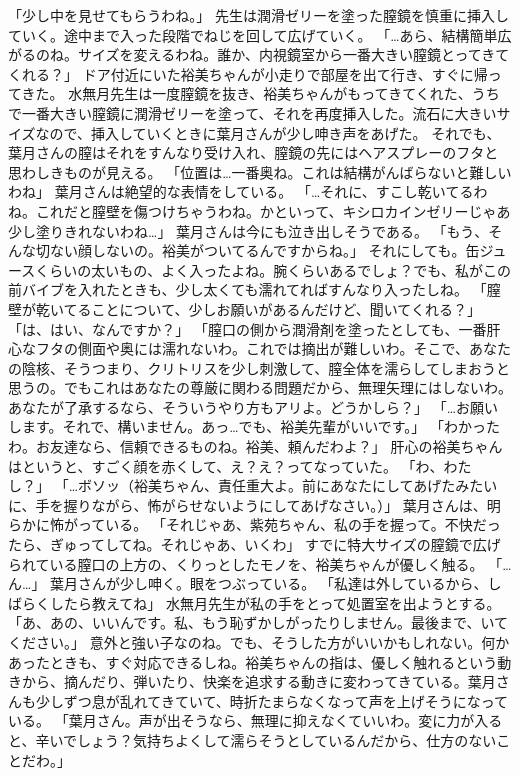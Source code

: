 「少し中を見せてもらうわね。」
先生は潤滑ゼリーを塗った膣鏡を慎重に挿入していく。途中まで入った段階でねじを回して広げていく。
「…あら、結構簡単広がるのね。サイズを変えるわね。誰か、内視鏡室から一番大きい膣鏡とってきてくれる？」
ドア付近にいた裕美ちゃんが小走りで部屋を出て行き、すぐに帰ってきた。
水無月先生は一度膣鏡を抜き、裕美ちゃんがもってきてくれた、うちで一番大きい膣鏡に潤滑ゼリーを塗って、それを再度挿入した。流石に大きいサイズなので、挿入していくときに葉月さんが少し呻き声をあげた。
それでも、葉月さんの膣はそれをすんなり受け入れ、膣鏡の先にはヘアスプレーのフタと思わしきものが見える。
「位置は…一番奥ね。これは結構がんばらないと難しいわね」
葉月さんは絶望的な表情をしている。
「…それに、すこし乾いてるわね。これだと膣壁を傷つけちゃうわね。かといって、キシロカインゼリーじゃあ少し塗りきれないわね…」
葉月さんは今にも泣き出しそうである。
「もう、そんな切ない顔しないの。裕美がついてるんですからね。」
それにしても。缶ジュースくらいの太いもの、よく入ったよね。腕くらいあるでしょ？でも、私がこの前バイブを入れたときも、少し太くても濡れてればすんなり入ったしね。
「膣壁が乾いてることについて、少しお願いがあるんだけど、聞いてくれる？」
「は、はい、なんですか？」
「膣口の側から潤滑剤を塗ったとしても、一番肝心なフタの側面や奥には濡れないわ。これでは摘出が難しいわ。そこで、あなたの陰核、そうつまり、クリトリスを少し刺激して、膣全体を濡らしてしまおうと思うの。でもこれはあなたの尊厳に関わる問題だから、無理矢理にはしないわ。あなたが了承するなら、そういうやり方もアリよ。どうかしら？」
「…お願いします。それで、構いません。あっ…でも、裕美先輩がいいです。」
「わかったわ。お友達なら、信頼できるものね。裕美、頼んだわよ？」
肝心の裕美ちゃんはというと、すごく顔を赤くして、え？え？ってなっていた。
「わ、わたし？」
「…ボソッ（裕美ちゃん、責任重大よ。前にあなたにしてあげたみたいに、手を握りながら、怖がらせないようにしてあげなさい。）」
葉月さんは、明らかに怖がっている。
「それじゃあ、紫苑ちゃん、私の手を握って。不快だったら、ぎゅってしてね。それじゃあ、いくわ」
すでに特大サイズの膣鏡で広げられている膣口の上方の、くりっとしたモノを、裕美ちゃんが優しく触る。
「…ん…」
葉月さんが少し呻く。眼をつぶっている。
「私達は外しているから、しばらくしたら教えてね」
水無月先生が私の手をとって処置室を出ようとする。
「あ、あの、いいんです。私、もう恥ずかしがったりしません。最後まで、いてください。」
意外と強い子なのね。でも、そうした方がいいかもしれない。何かあったときも、すぐ対応できるしね。裕美ちゃんの指は、優しく触れるという動きから、摘んだり、弾いたり、快楽を追求する動きに変わってきている。葉月さんも少しずつ息が乱れてきていて、時折たまらなくなって声を上げそうになっている。
「葉月さん。声が出そうなら、無理に抑えなくていいわ。変に力が入ると、辛いでしょう？気持ちよくして濡らそうとしているんだから、仕方のないことだわ。」
